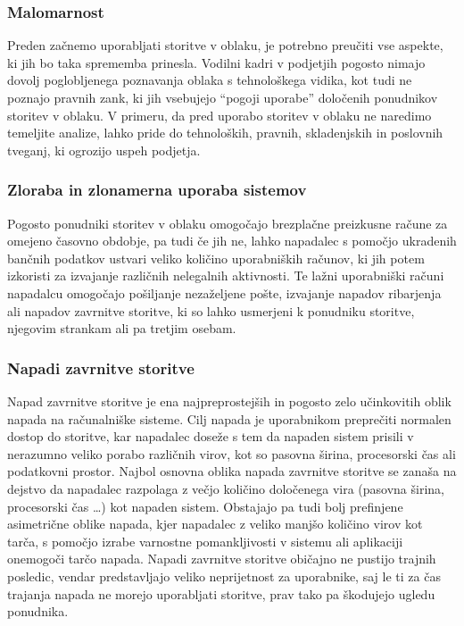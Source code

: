 \documentclass[12pt,a4paper,openany]{book}
\begin{document}
\subsubsection{Malomarnost}
Preden začnemo uporabljati storitve v oblaku, je potrebno preučiti vse aspekte, ki jih bo taka sprememba prinesla. Vodilni kadri v podjetjih pogosto nimajo dovolj poglobljenega poznavanja oblaka s tehnološkega vidika, kot tudi ne poznajo pravnih zank, ki jih vsebujejo “pogoji uporabe” določenih ponudnikov storitev v oblaku. V primeru, da pred uporabo storitev v oblaku ne naredimo temeljite analize, lahko pride do tehnoloških, pravnih, skladenjskih in poslovnih tveganj, ki ogrozijo uspeh podjetja.

\subsubsection{Zloraba in zlonamerna uporaba sistemov}
Pogosto ponudniki storitev v oblaku omogočajo brezplačne preizkusne račune za omejeno časovno obdobje, pa tudi če jih ne, lahko napadalec s pomočjo ukradenih bančnih podatkov ustvari veliko količino uporabniških računov, ki jih potem izkoristi za izvajanje različnih nelegalnih aktivnosti. Te lažni uporabniški računi napadalcu omogočajo pošiljanje nezaželjene pošte, izvajanje napadov ribarjenja ali napadov zavrnitve storitve, ki so lahko usmerjeni k ponudniku storitve, njegovim strankam ali pa tretjim osebam.

\subsubsection{Napadi zavrnitve storitve}
Napad zavrnitve storitve je ena najpreprostejših in pogosto zelo učinkovitih oblik napada na računalniške sisteme. Cilj napada je uporabnikom preprečiti normalen dostop do storitve, kar napadalec doseže s tem da napaden sistem prisili v nerazumno veliko porabo različnih virov, kot so pasovna širina, procesorski čas ali podatkovni prostor. Najbol osnovna oblika napada zavrnitve storitve se zanaša na dejstvo da napadalec razpolaga z večjo količino določenega vira (pasovna širina, procesorski čas …) kot napaden sistem. Obstajajo pa tudi bolj prefinjene asimetrične oblike napada, kjer napadalec z veliko manjšo količino virov kot tarča, s pomočjo izrabe varnostne pomankljivosti v sistemu ali aplikaciji onemogoči tarčo napada. Napadi zavrnitve storitve običajno ne pustijo trajnih posledic, vendar predstavljajo veliko neprijetnost za uporabnike, saj le ti za čas trajanja napada ne morejo uporabljati storitve, prav tako pa škodujejo ugledu ponudnika.
\end{document}

